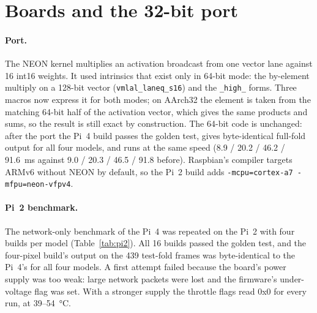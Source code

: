 \documentclass[11pt,a4paper]{article}
\begin{document}
\section{Boards and the 32-bit port}
\label{sec:boards}

\begin{table}[H]
\centering
\caption{The two target boards. Both were used without fan or heat sink.}
\label{tab:hw}
\end{table}

\paragraph{Port.} The NEON kernel multiplies an activation broadcast from
one vector lane against 16 int16 weights. It used intrinsics that exist
only in 64-bit mode: the by-element multiply on a 128-bit vector
(\texttt{vmlal\_laneq\_s16}) and the \texttt{\_high\_} forms. Three macros
now express it for both modes; on AArch32 the element is taken from the
matching 64-bit half of the activation vector, which gives the same
products and sums, so the result is still exact by construction. The
64-bit code is unchanged: after the port the Pi~4 build passes the golden
test, gives byte-identical full-fold output for all four models, and runs
at the same speed (8.9 / 20.2 / 46.2 / 91.6~ms against 9.0 / 20.3 / 46.5 /
91.8 before). Raspbian's compiler targets ARMv6 without NEON by default,
so the Pi~2 build adds \texttt{-mcpu=cortex-a7 -mfpu=neon-vfpv4}.

\paragraph{Pi~2 benchmark.} The network-only benchmark of the Pi~4 was
repeated on the Pi~2 with four builds per model (Table~\ref{tab:pi2}).
All 16 builds passed the golden test, and the four-pixel build's output
on the 439 test-fold frames was byte-identical to the Pi~4's for all four
models. A first attempt failed because the board's power supply was too
weak: large network packets were lost and the firmware's under-voltage
flag was set. With a stronger supply the throttle flags read 0x0 for
every run, at \SI{39}{}--\SI{54}{\celsius}.
\end{document}
